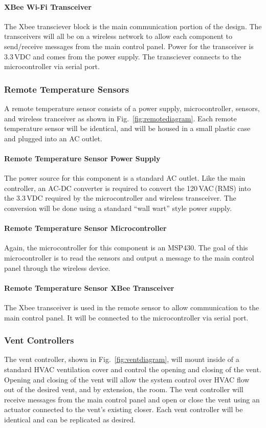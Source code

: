 \paragraph{XBee Wi-Fi Transceiver}
The Xbee transciever block is the main communication portion of the design.  The transceivers will all be on a wireless network to allow each component to send/receive messages from the main control panel.  Power for the transceiver is 3.3\,VDC and comes from the power supply. The transciever connects to the microcontroller via serial port.


\subsubsection{Remote Temperature Sensors}
A remote temperature sensor consists of a power supply, microcontroller, sensors, and wireless tranceiver as shown in Fig.~\ref{fig:remotediagram}.  Each remote temperature sensor will be identical, and will be housed in a small plastic case and plugged into an AC outlet.
\paragraph{Remote Temperature Sensor Power Supply}
The power source for this component is a standard AC outlet.  Like the main controller, an AC-DC converter is required to convert the 120\,VAC\,(RMS) into the 3.3\,VDC required by the microcontroller and wireless transceiver.  The conversion will be done using a standard ``wall wart'' style power supply.
\paragraph{Remote Temperature Sensor Microcontroller}
Again, the microcontroller for this component is an MSP430. The goal of this microcontroller is to read the sensors and output a message to the main control panel through the wireless device.
\paragraph{Remote Temperature Sensor XBee Transceiver}
The Xbee transceiver is used in the remote sensor to allow communication to the main control panel. It will be connected to the microcontroller via serial port.

\subsubsection{Vent Controllers}
The vent controller, shown in Fig.~\ref{fig:ventdiagram}, will mount inside of a standard HVAC ventilation cover and control the opening and closing of the vent.  Opening and closing of the vent will allow the system control over HVAC flow out of the desired vent, and by extension, the room. The vent controller will receive messages from the main control panel and open or close the vent using an actuator connected to the vent's existing closer. Each vent controller will be identical and can be replicated as desired.
